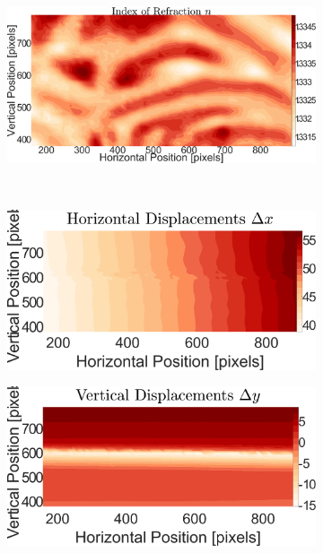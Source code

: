 \documentclass{svjour3}                     %
\begin{document}
\begin{figure}[htbp]
\begin{subfigure}{.5\linewidth}
		\label{fig:twolayer0side}
\end{subfigure}%
\begin{subfigure}{.5\linewidth}
	\centering \includegraphics[width = \textwidth]{Calibrationnsurf}
	\label{fig:ncalibration0side}
\end{subfigure}\\
\begin{subfigure}{.5\linewidth}
		\centering \includegraphics[width = \textwidth]{TL_DX}
		\label{fig:dx0side}
\end{subfigure}%
\begin{subfigure}{.5\linewidth}
	\centering \includegraphics[width = \textwidth]{TL_DY}

\end{subfigure}
\end{figure}
\end{document}
